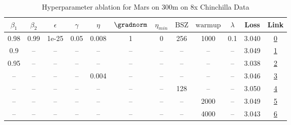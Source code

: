 \begin{table}[H]
\centering
\caption{Hyperparameter ablation for Mars on 300m on 8x Chinchilla Data}
\label{tab:ablation_mars_300m_on_8x_chinchilla_data}
\begin{tabular}{cccccccccccc}
\toprule
$\beta_1$ & $\beta_2$ & $\epsilon$ & $\gamma$ & $\eta$ & $\gradnorm$ & $\eta_{min}$ & $\mathrm{BSZ}$ & $\mathrm{warmup}$ & $\lambda$ & Loss & Link \\
\midrule
0.98 & 0.99 & 1e-25 & 0.05 & 0.008 & 1 & 0 & 256 & 1000 & 0.1 & 3.040 & \href{https://wandb.ai/stanford-mercury/optimizer-scaling/runs/sweep-300m-48B-mars3a0394lr0.008-wd0.1-minlr0-warmup1000-b10.98--b18370}{0} \\
\midrule
0.9 & -- & -- & -- & -- & -- & -- & -- & -- & -- & 3.049 & \href{https://wandb.ai/stanford-mercury/optimizer-scaling/runs/sweep-300m-48B-mars4c3c64lr0.008-wd0.1-minlr0-warmup1000-b10.9-b-ccb8c7}{1} \\
0.95 & -- & -- & -- & -- & -- & -- & -- & -- & -- & 3.038 & \href{https://wandb.ai/stanford-mercury/optimizer-scaling/runs/sweep-300m-48B-mars1b232dlr0.008-wd0.1-minlr0-warmup1000-b10.95--2bd6f5}{2} \\
-- & -- & -- & -- & 0.004 & -- & -- & -- & -- & -- & 3.046 & \href{https://wandb.ai/stanford-mercury/optimizer-scaling/runs/sweep-300m-48B-mars0f0b4flr0.004-wd0.1-minlr0-warmup1000-b10.98--98eb68}{3} \\
-- & -- & -- & -- & -- & -- & -- & 128 & -- & -- & 3.050 & \href{https://wandb.ai/stanford-mercury/optimizer-scaling/runs/sweep-300m-48B-marsac45felr0.008-wd0.1-minlr0-warmup1000-b10.98--af6362}{4} \\
-- & -- & -- & -- & -- & -- & -- & -- & 2000 & -- & 3.049 & \href{https://wandb.ai/stanford-mercury/optimizer-scaling/runs/sweep-300m-48B-marsfe179elr0.008-wd0.1-minlr0-warmup2000-b10.98--8b1315}{5} \\
-- & -- & -- & -- & -- & -- & -- & -- & 4000 & -- & 3.043 & \href{https://wandb.ai/stanford-mercury/optimizer-scaling/runs/sweep-300m-48B-mars529c1blr0.008-wd0.1-minlr0-warmup4000-b10.98--47eaf7}{6} \\
\bottomrule
\end{tabular}
\end{table}

